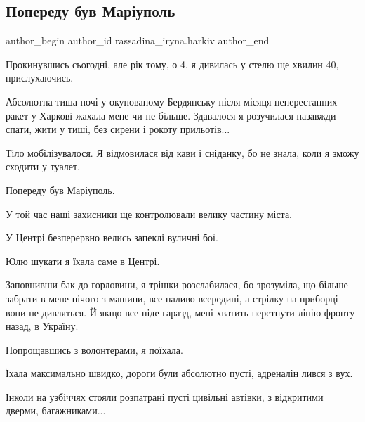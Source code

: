  
 
 
 
 

\subsection{Попереду був Маріуполь}
\label{sec:18_03_2023.fb.rassadina_iryna.harkiv.1.poperedu_buv_mar_upo}

\ifcmt
 author_begin
   author_id rassadina_iryna.harkiv
 author_end
\fi

Прокинувшись сьогодні, але рік тому, о 4, я дивилась у стелю ще хвилин 40,
прислухаючись. 

Абсолютна тиша ночі у окупованому Бердянську після місяця неперестанних ракет у
Харкові жахала мене чи не більше. Здавалося я розучилася назавжди спати, жити у
тиші, без сирени і рокоту прильотів...

Тіло мобілізувалося. Я відмовилася від кави і сніданку, бо не знала, коли я
зможу сходити у туалет. 

Попереду був Маріуполь. 

У той час наші захисники ще контролювали велику частину міста. 

У Центрі безперервно велись запеклі вуличні бої. 

Юлю шукати я їхала саме в Центрі.

Заповнивши бак до горловини, я трішки розслабилася,  бо зрозуміла, що більше
забрати в мене нічого з машини, все паливо всередині,  а стрілку на приборці
вони не дивляться. Й якщо все піде гаразд, мені хватить перетнути лінію фронту
назад, в Україну.

Попрощавшись з волонтерами, я поїхала.


Їхала максимально швидко, дороги були абсолютно пусті, адреналін лився з вух.

Інколи на узбіччях стояли розпатрані пусті цивільні автівки, з відкритими
дверми, багажниками...

